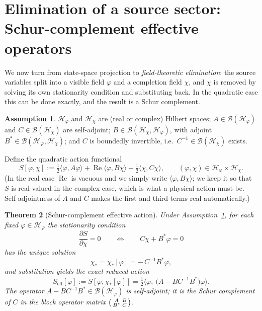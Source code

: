 \documentclass[11pt,reqno]{amsart}
\numberwithin{equation}{section}
\theoremstyle{plain}
\newtheorem{theorem}{Theorem}[section]
\theoremstyle{definition}
\newtheorem{assumption}[theorem]{Assumption}
\theoremstyle{remark}
\newcommand{\Seff}{S_{\mathrm{eff}}}
\newcommand{\inner}[2]{\langle #1 , #2 \rangle}
\begin{document}
\section{Elimination of a source sector: Schur-complement effective operators}
\label{sec:schur}

We now turn from state-space projection to \emph{field-theoretic elimination}: the source
variables split into a visible field $\varphi$ and a completion field $\chi$, and $\chi$ is
removed by solving its own stationarity condition and substituting back. In the quadratic
case this can be done exactly, and the result is a Schur complement.

\begin{assumption}
\label{ass:schur}
$\mathcal{H}_{\varphi}$ and $\mathcal{H}_{\chi}$ are (real or complex) Hilbert spaces;
$A\in\mathcal{B}(\mathcal{H}_{\varphi})$ and $C\in\mathcal{B}(\mathcal{H}_{\chi})$ are
self-adjoint; $B\in\mathcal{B}(\mathcal{H}_{\chi},\mathcal{H}_{\varphi})$, with adjoint
$B^{*}\in\mathcal{B}(\mathcal{H}_{\varphi},\mathcal{H}_{\chi})$; and $C$ is boundedly
invertible, i.e.\ $C^{-1}\in\mathcal{B}(\mathcal{H}_{\chi})$ exists.
\end{assumption}

Define the quadratic action functional
\begin{equation}
\label{eq:action}
S[\varphi,\chi]
:=\tfrac12\inner{\varphi}{A\varphi}
+\operatorname{Re}\inner{\varphi}{B\chi}
+\tfrac12\inner{\chi}{C\chi},
\qquad
(\varphi,\chi)\in\mathcal{H}_{\varphi}\times\mathcal{H}_{\chi}.
\end{equation}
(In the real case $\operatorname{Re}$ is vacuous and we simply write
$\inner{\varphi}{B\chi}$; we keep it so that $S$ is real-valued in the complex case, which is
what a physical action must be. Self-adjointness of $A$ and $C$ makes the first and third
terms real automatically.)

\begin{theorem}[Schur-complement effective action]
\label{thm:schur}
Under Assumption~\ref{ass:schur}, for each fixed $\varphi\in\mathcal{H}_{\varphi}$ the
stationarity condition
\begin{equation}
\label{eq:chieq}
\frac{\partial S}{\partial\chi}=0
\qquad\Longleftrightarrow\qquad
C\chi+B^{*}\varphi=0
\end{equation}
has the unique solution
\begin{equation}
\label{eq:chistar}
\chi_{*}=\chi_{*}[\varphi]=-\,C^{-1}B^{*}\varphi ,
\end{equation}
and substitution yields the exact reduced action
\begin{equation}
\label{eq:Seff}
\boxed{\ \
\Seff[\varphi]:=S[\varphi,\chi_{*}[\varphi]]
=\tfrac12\bigl\langle\varphi,\ \bigl(A-BC^{-1}B^{*}\bigr)\varphi\bigr\rangle .
\ \ }
\end{equation}
The operator $A-BC^{-1}B^{*}\in\mathcal{B}(\mathcal{H}_{\varphi})$ is self-adjoint; it is the
Schur complement of $C$ in the block operator matrix
$\begin{psmallmatrix}A&B\\ B^{*}&C\end{psmallmatrix}$.
\end{theorem}
\end{document}

